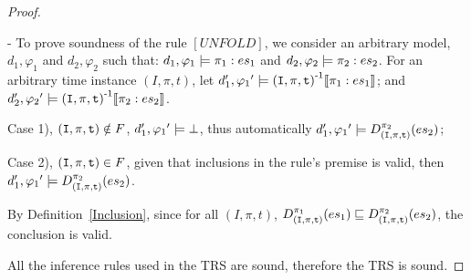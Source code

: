 \documentclass[acmsmall,10pt,review]{acmart}
\newcommand{\es}{\textcolor{black}{\ensuremath{{es}}}}
\newcommand{\codeme}[1]{{\tt{\ensuremath{#1}}}}
\newcommand{\bott}{\textcolor{black}{\ensuremath{\bot}}}
\newcommand{\CONTAIN}{\sqsubseteq}
\newcommand\defref[1]{Definition~\textcolor{blue}{\ref{#1}}}
\begin{document}
\begin{proof}
\begin{enumerate}
- To prove soundness of the rule \codeme{[UNFOLD]}, we consider an arbitrary model, \codeme{d_1,  \varphi_1} and \codeme{d_2,  \varphi_2}  such that:  \codeme{d_1,  \varphi_1 \models {\pi_1 : \es_1}} and \codeme{d_2,  \varphi_2 \models  {\pi_2 : \es_2}}. For an arbitrary time instance \codeme{(I, \pi, t)}, let \codeme{d_1^\prime, {\varphi_1}^\prime \models \codeme{(I, \pi, t)}^{\text{-}1}\llbracket  \pi_1: \es_1 \rrbracket}; and 
\codeme{d_2^\prime, {\varphi_2}^\prime \models \codeme{(I, \pi, t)}^{\text{-}1}\llbracket \pi_2 : \es_2 \rrbracket}. 

Case 1), \codeme{\codeme{(I, \pi, t)} \notin F}, \codeme{d_1^\prime, {\varphi_1}^\prime \models \bott}, thus automatically \codeme{d_1^\prime, {\varphi_1}^\prime \models D^{\pi_2}_{\codeme{(I, \pi, t)}}( \es_2)};

Case 2), \codeme{\codeme{(I, \pi, t)} \in F}, given that inclusions in the rule's premise is valid, then \codeme{d_1^\prime, {\varphi_1}^\prime \models D^{\pi_2}_{\codeme{(I, \pi, t)}}( \es_2)}. 

By \defref{Inclusion}, since for all \codeme{(I, \pi, t)}, \codeme{D^{\pi_1}_{\codeme{(I, \pi, t)}} (\es_1) \CONTAIN    D^{\pi_2}_{\codeme{(I, \pi, t)}}( \es_2)}, the conclusion is valid. 
\\

\end{enumerate}
All the inference rules used in the TRS are sound, therefore the TRS is sound.
\end{proof}

 
\end{document}
